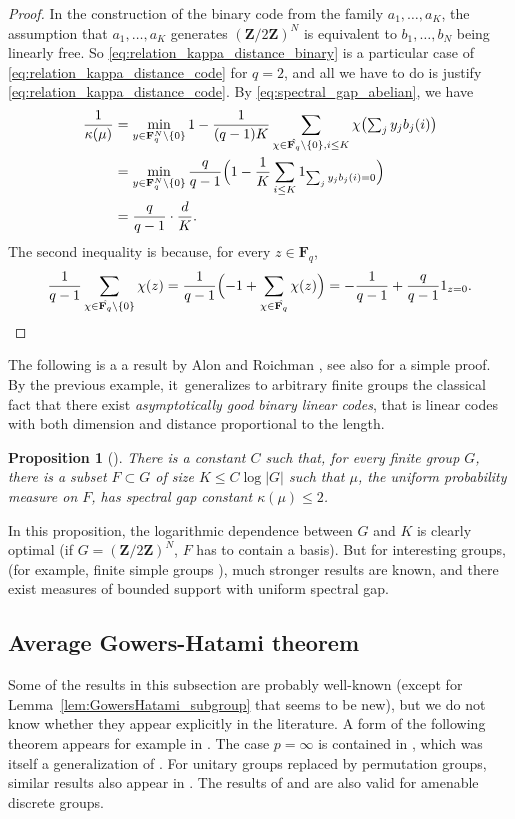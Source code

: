 \documentclass[10pt]{amsart}
\let\ts\textstyle
\theoremstyle{plain}
\newtheorem{proposition}[theorem]{Proposition}
\theoremstyle{definition}
\newcommand{\Z}{\mathbf{Z}}
\newcommand{\F}{\mathbf{F}}
\begin{document}
\begin{proof} In the construction of the binary code from the family $a_1,\dots,a_K$, the assumption that $a_1,\dots,a_K$ generates $(\Z/2\Z)^N$ is equivalent to $b_1,\dots,b_N$ being linearly free. So \eqref{eq:relation_kappa_distance_binary} is a particular case of \eqref{eq:relation_kappa_distance_code} for $q=2$, and all we have to do is justify \eqref{eq:relation_kappa_distance_code}. By \eqref{eq:spectral_gap_abelian}, we have
\begin{align*}
\frac{1}{\kappa(\mu)}& =\min_{y \in \F_q^N\setminus\{0\}}1-\frac{1}{(q-1)K} \sum_{\chi \in\hat{\F_q}\setminus\{0\}, i\leq K} \chi\bigl(\ts\sum_j y_j b_j(i)\bigr)\\
& =\min_{y \in \F_q^N\setminus\{0\}}\frac{q}{q-1}\Bigl(1-\frac{1}{K} \sum_{i\leq K} 1_{\sum_j y_j b_j(i)=0}\Bigr)\\
& =\frac{q}{q-1}\cdot\frac{d}{K}.
\end{align*}
The second inequality is because, for every $z \in\F_q$,
\[
\frac{1}{q-1} \sum_{\chi \in\hat{\F_q}\setminus\{0\}} \chi(z) = \frac{1}{q-1}\Bigl(-1+\sum_{\chi \in\hat{\F_q}}\chi(z)\Bigr) = -\frac{1}{q-1} +\frac{q}{q-1} 1_{z=0}.\qedhere
\]
\end{proof}

The following is a a result by Alon and Roichman \cite{MR1262979}, see also \cite{MR2097328} for a simple proof. By the previous example, it~generalizes to arbitrary finite groups the classical fact that there exist \emph{asymptotically good binary linear codes}, that is linear codes with both dimension and distance proportional to the length.

\begin{proposition}[\cite{MR1262979}]\label{prop:measure_with_small_support_and_small_Fourier_transform_nonabelian} There is a constant $C$ such that, for every finite group $G$, there is a subset $F \subset G$ of size $K\leq C \log |G|$ such that $\mu$, the uniform probability measure on $F$, has spectral gap constant $\kappa(\mu)\leq 2$.
\end{proposition}
In this proposition, the logarithmic dependence between $G$ and $K$ is clearly optimal (if $G=(\Z/2\Z)^N$, $F$ has to contain a basis). But for interesting groups, (for example, finite simple groups \cite{MR2221038}), much stronger results are known, and there exist measures of bounded support with uniform spectral gap.

\subsection{Average Gowers-Hatami theorem}
Some of the results in this subsection are probably well-known (except for Lemma~\ref{lem:GowersHatami_subgroup} that seems to be new), but we do not know whether they appear explicitly in the literature. A form of the following theorem appears for example in \cite{vidickPauliBraiding}. The case $p=\infty$ is contained in \cite{MR3867328}, which was itself a generalization of \cite{MR3733361}. For unitary groups replaced by permutation groups, similar results also appear in \cite{beckerChapman}. The results of \cite{MR3867328} and \cite{beckerChapman} are also valid for amenable discrete groups.
\end{document}
